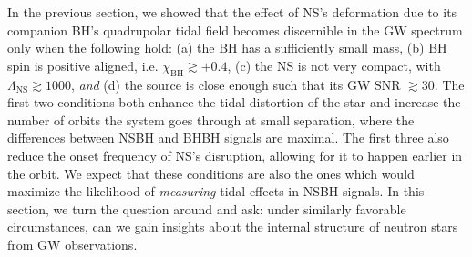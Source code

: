 \documentclass[aps,prd,amsmath,floats,floatfix, twocolumn,
superscriptaddress,nofootinbib,showpacs]{revtex4-1}
\newcommand{\red}{\textcolor{red}}
\newcommand{\prayush}{\textcolor{red!40!black}}
\newcommand{\lambdans}{\Lambda_\mathrm{NS}}
\newcommand{\chibh}{\chi_\mathrm{BH}}
\begin{document}
%

In the previous section, we showed that the effect of NS's deformation due to
its companion BH's quadrupolar tidal field becomes discernible in the
GW spectrum only when the following hold:
(a) the BH has a sufficiently small mass, (b) BH spin
is positive aligned, i.e. $\chibh\gtrsim +0.4$, (c) the NS is not very compact,
with $\lambdans\gtrsim 1000$, {\it and} (d) the source is close enough
such that its GW SNR $\gtrsim 30$.
% 
The first two conditions both enhance the tidal distortion of the star and increase
the number of orbits the system goes through at small separation, where the
differences between NSBH and BHBH signals are maximal.
% 
The first three also reduce the onset frequency of NS's disruption, allowing
for it to happen earlier in the orbit. 
% 
We expect that these conditions are also the ones which would maximize the
likelihood of {\it measuring} tidal effects in NSBH signals. In this section,
%
%
%
we turn the question around and ask: under similarly favorable circumstances, can
we gain insights about the internal structure of neutron stars from GW observations.
\end{document}
